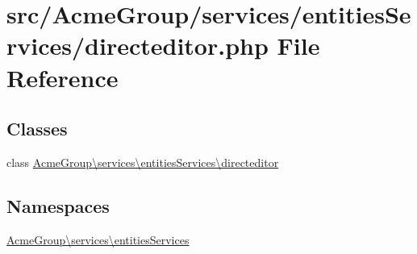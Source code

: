 \hypertarget{directeditor_8php}{\section{src/\+Acme\+Group/services/entities\+Services/directeditor.php File Reference}
\label{directeditor_8php}
}
\subsection*{Classes}
\begin{DoxyCompactItemize}
\item 
class \hyperlink{class_acme_group_1_1services_1_1entities_services_1_1directeditor}{Acme\+Group\textbackslash{}services\textbackslash{}entities\+Services\textbackslash{}directeditor}
\end{DoxyCompactItemize}
\subsection*{Namespaces}
\begin{DoxyCompactItemize}
\item 
 \hyperlink{namespace_acme_group_1_1services_1_1entities_services}{Acme\+Group\textbackslash{}services\textbackslash{}entities\+Services}
\end{DoxyCompactItemize}
